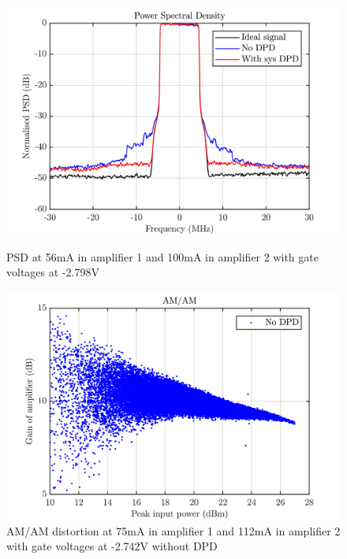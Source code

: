 \begin{figure}[H]
  \centering
  \begin{minipage}[b]{0.5\textwidth}
	\includegraphics[scale = 0.5]{figures/measurement/cree/meas5/psd_2p798v.png}
	\caption{PSD at 56mA in amplifier 1 and 100mA in amplifier 2 with gate voltages at -2.798V}	
    \label{fig:meas5_3}
  \end{minipage}
  \hfill
  \begin{minipage}[b]{0.4\textwidth}
	\includegraphics[scale = 0.5]{figures/measurement/cree/meas5/amam_no_dpd_2p742v.png}
	\caption{AM/AM distortion at 75mA in amplifier 1 and 112mA in amplifier 2 with gate voltages at -2.742V without DPD}
    \label{fig:meas5_4}
  \end{minipage}
\end{figure}

